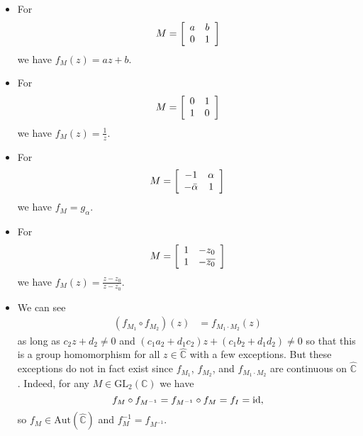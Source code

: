 \begin{xmpl}
  \begin{itemize}
    \item{
      For
      $$
        M
      = \left[
          \begin{array}{c c}
            a & b \\
            0 & 1
          \end{array}
        \right]
      $$
      we have $f_M(z) = a z + b$.
    }
    \item{
      For
      $$
        M
      = \left[
          \begin{array}{c c}
            0 & 1 \\
            1 & 0
          \end{array}
        \right]
      $$
      we have $f_M(z) = \frac{1}{z}$.
    }
    \item{
      For
      $$
        M
      = \left[
          \begin{array}{c c}
            -1            & \alpha \\
            -\bar{\alpha} & 1
          \end{array}
        \right]
      $$
      we have $f_M = g_\alpha$.
    }
    \item{
      For
      $$
        M
      = \left[
          \begin{array}{c c}
            1 & -z_0 \\
            1 & -\overline{z_0}
          \end{array}
        \right]
      $$
      we have $f_M(z) = \frac{z - z_0}{z - \overline{z_0}}$.
    }
    \item{
      We can see
      \begin{align*}
         (f_{M_1} \circ f_{M_2})(z)
      &= f_{M_1 \cdot M_2}(z)
      \end{align*}
      as long as $c_2 z + d_2 \neq 0$ and
      $(c_1 a_2 + d_1 c_2)z + (c_1 b_2 + d_1 d_2) \neq 0$
      so that this is a group homomorphism for all
      $z \in \hat{\mathbb{C}}$ with a few exceptions. But
      these exceptions do not in fact exist since
      $f_{M_1}$, $f_{M_2}$, and $f_{M_1 \cdot M_2}$ are continuous
      on $\hat{\mathbb{C}}$. Indeed, for any
      $M \in \mathrm{GL}_2(\mathbb{C})$ we have
      $$
      f_M \circ f_{M^{-1}} = f_{M^{-1}} \circ f_M = f_I = \mathrm{id},
      $$
      so $f_M \in \mathrm{Aut}(\hat{\mathbb{C}})$ and
      $f_M^{-1} = f_{M^{-1}}$.
    }
  \end{itemize}
\end{xmpl}

